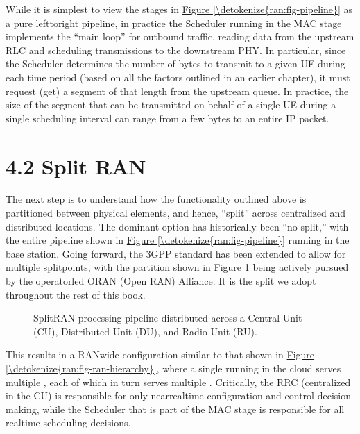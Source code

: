 \documentclass[a4paper,11pt,english]{sphinxmanual}
\let\sphinxpxdimen\pdfpxdimen\else\newdimen\sphinxpxdimen
\begin{document}
\sphinxAtStartPar
While it is simplest to view the stages in \hyperref[\detokenize{ran:fig-pipeline}]{Figure \ref{\detokenize{ran:fig-pipeline}}}
as a pure left\sphinxhyphen{}to\sphinxhyphen{}right pipeline, in practice the Scheduler running in the
MAC stage implements the “main loop” for outbound traffic, reading data
from the upstream RLC and scheduling transmissions to the downstream
PHY. In particular, since the Scheduler determines the number of bytes
to transmit to a given UE during each time period (based on all the
factors outlined in an earlier chapter), it must request (get) a segment
of that length from the upstream queue. In practice, the size of the
segment that can be transmitted on behalf of a single UE during a single
scheduling interval can range from a few bytes to an entire IP packet.


\section{4.2 Split RAN}
\label{\detokenize{ran:split-ran}}
\sphinxAtStartPar
The next step is to understand how the functionality outlined above is
partitioned between physical elements, and hence, “split” across
centralized and distributed locations. The dominant option has
historically been “no split,” with the entire pipeline shown in
\hyperref[\detokenize{ran:fig-pipeline}]{Figure \ref{\detokenize{ran:fig-pipeline}}} running in the base station.  Going
forward, the 3GPP standard has been extended to allow for multiple
split\sphinxhyphen{}points, with the partition shown in \hyperref[\detokenize{ran:fig-split-ran}]{Figure \ref{\detokenize{ran:fig-split-ran}}} being actively pursued by the operator\sphinxhyphen{}led O\sphinxhyphen{}RAN
(Open RAN) Alliance. It is the split we adopt throughout the rest of
this book.

\begin{figure}[ht]
\centering
\capstart

\noindent\sphinxincludegraphics[width=600\sphinxpxdimen]{{Slide15}.png}
\caption{Split\sphinxhyphen{}RAN processing pipeline distributed across a
Central Unit (CU), Distributed Unit (DU), and Radio Unit (RU).}\label{\detokenize{ran:id2}}\label{\detokenize{ran:fig-split-ran}}\end{figure}

\sphinxAtStartPar
This results in a RAN\sphinxhyphen{}wide configuration similar to that shown in
\hyperref[\detokenize{ran:fig-ran-hierarchy}]{Figure \ref{\detokenize{ran:fig-ran-hierarchy}}}, where a single 
running in the cloud serves multiple , each of
which in turn serves multiple . Critically, the RRC
(centralized in the CU) is responsible for only near\sphinxhyphen{}real\sphinxhyphen{}time
configuration and control decision making, while the Scheduler that is
part of the MAC stage is responsible for all real\sphinxhyphen{}time scheduling
decisions.
\end{document}
